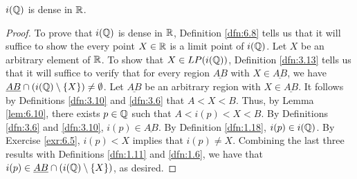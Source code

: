 \documentclass[../main.tex]{subfiles}
\begin{document}
\begin{theorem}\label{trm:6.11}
    $i(\mathbb{Q})$ is dense in $\mathbb{R}$.
    \begin{proof}
        To prove that $i(\mathbb{Q})$ is dense in $\mathbb{R}$, Definition \ref{dfn:6.8} tells us that it will suffice to show the every point $X\in\mathbb{R}$ is a limit point of $i(\mathbb{Q})$. Let $X$ be an arbitrary element of $\mathbb{R}$. To show that $X\in LP(i(\mathbb{Q}))$, Definition \ref{dfn:3.13} tells us that it will suffice to verify that for every region $\underline{AB}$ with $X\in\underline{AB}$, we have $\underline{AB}\cap(i(\mathbb{Q})\setminus\{X\})\neq\emptyset$. Let $\underline{AB}$ be an arbitrary region with $X\in\underline{AB}$. It follows by Definitions \ref{dfn:3.10} and \ref{dfn:3.6} that $A<X<B$. Thus, by Lemma \ref{lem:6.10}, there exists $p\in\mathbb{Q}$ such that $A<i(p)<X<B$. By Definitions \ref{dfn:3.6} and \ref{dfn:3.10}, $i(p)\in\underline{AB}$. By Definition \ref{dfn:1.18}, $i(p)\in i(\mathbb{Q})$. By Exercise \ref{exr:6.5}, $i(p)<X$ implies that $i(p)\neq X$. Combining the last three results with Definitions \ref{dfn:1.11} and \ref{dfn:1.6}, we have that $i(p)\in\underline{AB}\cap(i(\mathbb{Q})\setminus\{X\})$, as desired.
    \end{proof}
\end{theorem}
\end{document}
